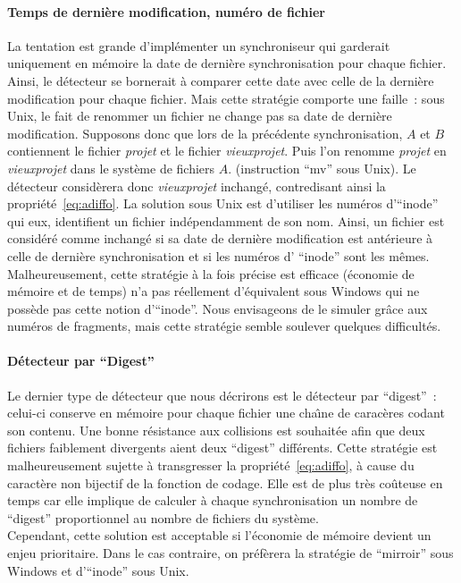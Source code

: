 \documentclass[11pt]{report}
\begin{document}
\paragraph{Temps de derni\`ere modification, num\'ero de fichier\\}
La tentation est grande d'impl\'ementer un synchroniseur qui garderait 
uniquement en m\'emoire la date de derni\`ere synchronisation pour chaque 
fichier. Ainsi, le d\'etecteur se bornerait \`a comparer cette date avec celle
de la derni\`ere modification pour chaque fichier. Mais cette strat\'egie comporte une faille~: sous Unix, le fait de renommer un fichier ne change pas sa 
date de derni\`ere modification. Supposons donc que lors de la pr\'ec\'edente
synchronisation, $A$ et $B$ contiennent le fichier \emph{projet} et le fichier
\emph{vieuxprojet}. Puis l'on renomme \emph{projet} en \emph{vieuxprojet} dans
le syst\`eme de fichiers $A$.
(instruction ``mv'' sous Unix). Le d\'etecteur consid\`erera donc \emph{vieuxprojet} inchang\'e, contredisant ainsi la propri\'et\'e~\ref{eq:adiffo}.
La solution sous Unix est d'utiliser les num\'eros d'``inode'' qui eux, 
identifient un fichier ind\'ependamment de son nom. Ainsi, un fichier est
consid\'er\'e comme inchang\'e si sa date de derni\`ere modification est
ant\'erieure \`a celle de derni\`ere synchronisation et si les num\'eros d'
``inode'' sont les m\^emes.
Malheureusement, cette strat\'egie \`a la fois pr\'ecise est efficace
(\'economie de m\'emoire et de temps) n'a pas r\'eellement d'\'equivalent
 sous Windows qui ne poss\`ede pas cette notion d'``inode''. Nous envisageons
de le simuler gr\^ace aux num\'eros de fragments, mais cette strat\'egie semble
soulever quelques difficult\'es.
\paragraph{D\'etecteur par ``Digest''\\}
Le dernier type de d\'etecteur que nous d\'ecrirons est le d\'etecteur 
par ``digest''~: celui-ci conserve en m\'emoire pour chaque fichier 
une cha\^{\i}ne de carac\`eres codant son contenu. 
Une bonne r\'esistance aux collisions est souhait\'ee
afin que deux fichiers faiblement divergents aient deux ``digest''
diff\'erents.
Cette strat\'egie est malheureusement sujette \`a transgresser la 
propri\'et\'e~\ref{eq:adiffo}, \`a cause du caract\`ere non bijectif de la 
fonction de codage. Elle est de plus tr\`es co\^uteuse en temps car
elle implique de calculer \`a chaque synchronisation un nombre de
``digest'' proportionnel au nombre de fichiers du syst\`eme. \\
Cependant, cette solution est acceptable si l'\'economie de m\'emoire devient
un enjeu prioritaire. Dans le cas contraire, on pr\'ef\`erera la strat\'egie
de ``mirroir'' sous Windows et d'``inode'' sous Unix.
\end{document}

